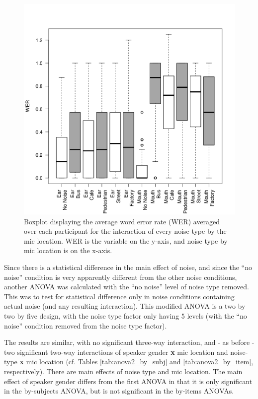 \documentclass[dissertation,copyright]{uathesis}
\makeatletter
\def\maxwidth{ %
  \ifdim\Gin@nat@width>\linewidth
    \linewidth
  \else
    \Gin@nat@width
  \fi
}
\makeatother
\begin{document}
\begin{figure}[h!]%

\includegraphics[width=\maxwidth]{figure/boxplot_noiseXmic-1} 

\caption{Boxplot displaying the average word error rate (WER) averaged over each participant for the interaction of every noise type by the mic location. WER is the variable on the y-axis, and noise type by mic location is on the x-axis.}
\label{fig:anova1_noiseXmic_boxplot}
\end{figure}


Since there is a statistical difference in the main effect of noise, and since the ``no noise'' condition is very apparently different from the other noise conditions, another ANOVA was calculated with the ``no noise'' level of noise type removed.  This was to test for statistical difference only in noise conditions containing actual noise (and any resulting interaction). This modified ANOVA is a two by two by five design, with the noise type factor only having 5 levels (with the ``no noise'' condition removed from the noise type factor).

The results are similar, with no significant three-way interaction, and - as before - two significant two-way interactions of speaker gender \textbf{x} mic location and noise-type \textbf{x} mic location (cf. Tables \ref{tab:anova2_by_subj} and \ref{tab:anova2_by_item}, respectively).  There are main effects of noise type and mic location.  The main effect of speaker gender differs from the first ANOVA in that it is only significant in the by-subjects ANOVA, but is not significant in the by-items ANOVAs.
\end{document}
